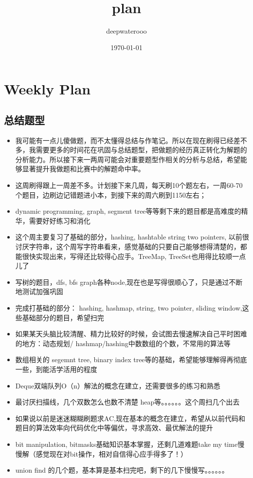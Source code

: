 \documentclass[9pt, b5paaper]{book}
\author{deepwaterooo}
\date{\today}
\title{plan}
\begin{document}
\maketitle
\tableofcontents


\chapter{Weekly Plan}
\label{sec-1}
\section{总结题型}
\label{sec-1-1}
\begin{itemize}
\item 我可能有一点儿傻做题，而不太懂得总结与作笔记。所以在现在刷得已经差不多，我需要更多的时间花在巩固与总结题型，把做题的经历真正转化为解题的分析能力。所以接下来一两周可能会对重要题型作相关的分析与总结，希望能够显著提升我做题和比赛中的解题命中率。

\item 这周刷得跟上一周差不多。计划接下来几周，每天刷10个题左右，一周60-70个题目，边刷边记错题进小本，到接下来的周六刷到1150左右；
\item dynamic programming, graph, segment tree等等剩下来的题目都是高难度的精华，需要好好练习和消化

\item 这个周主要复习了基础的部分，hashing, hashtable string two pointers, 以前很讨厌字符串，这个周写字符串看来，感觉基础的只要自己能够想得清楚的，都能很快实现出来，写得还比较得心应手。TreeMap, TreeSet也用得比较顺一点儿了
\item 写树的题目，dfs, bfs graph各种node,现在也是写得很顺心了，只是通过不断地测试加强巩固

\item 完成打基础的部分： hashing, hashmap, string, two pointer, sliding window,这些基础部分的题目，希望扫完
\item 如果某天头脑比较清醒、精力比较好的时候，会试图去慢速解决自己平时困难的地方：动态规划/ hashmap/hashing中数数组的个数，不常用的算法等

\item 数组相关的 segemnt tree, binary index tree等的基础，希望能够理解得再彻底一些，到能活学活用的程度
\item Deque双端队列O（n）解法的概念在建立，还需要很多的练习和熟悉
\item 最讨厌扫描线，几个双数怎么也数不清楚 heap等。。。。。。这个周扫几个出去

\item 如果说以前是迷迷糊糊刷题求AC,现在基本的概念在建立，希望从以前代码和题目的算法效率向代码优化中等偏优，寻求高效、最优解法的提升
\item bit manipulation, bitmasks基础知识基本掌握，还剩几道难题take my time慢慢解（感觉现在对bit操作，相对自信得心应手得多了！）
\item union find 的几个题，基本算是基本扫完吧，剩下的几下慢慢写。。。。。。


\end{itemize}
\end{document}
